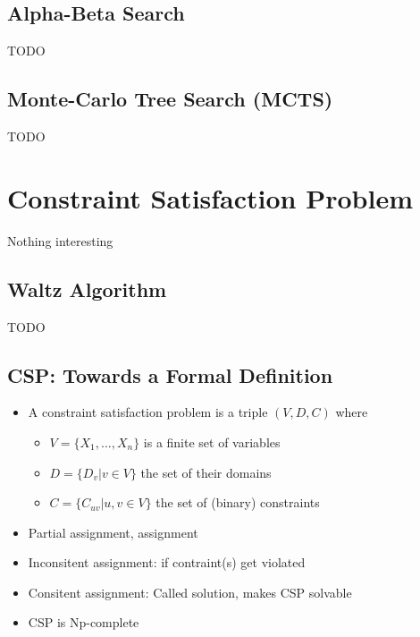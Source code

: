 \documentclass{scrartcl}
\begin{document}
\subsection{Alpha-Beta Search}
TODO
\subsection{Monte-Carlo Tree Search (MCTS)}
TODO
\section{Constraint Satisfaction Problem}
Nothing interesting
\subsection{Waltz Algorithm}
TODO

\subsection{CSP: Towards a Formal Definition}
\begin{itemize}
    \item
        A constraint satisfaction problem is a triple $(V, D, C)$ where
        \begin{itemize}
            \item
                $V = \{X_1, \dots, X_n\}$ is a finite set of variables
            \item
                $D = \{D_v | v \in V\}$ the set of their domains
            \item
                $C = \{C_{uv} | u, v \in V \}$ the set of (binary) constraints
        \end{itemize}
    \item
        Partial assignment, assignment
    \item
        Inconsitent assignment: if contraint(s) get violated
    \item
        Consitent assignment: Called solution, makes CSP solvable
    \item
        CSP is Np-complete
\end{itemize}
\end{document}
